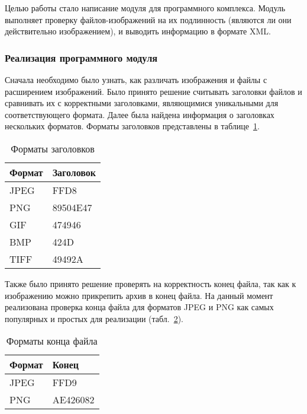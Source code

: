 Целью работы стало написание модуля для программного комплекса. Модуль выполняет проверку файлов-изображений на их подлинность (являются ли они действительно изображением), и выводить информацию в формате XML.

\subsubsection{Реализация программного модуля}
Сначала необходимо было узнать, как различать изображения и файлы с расширением изображений. Было принято решение считывать заголовки файлов и сравнивать их с корректными заголовками, являющимися уникальными для соответствующего формата. Далее была найдена информация о заголовках нескольких форматов. Форматы заголовков представлены в таблице~\ref{tab:formats}.

\begin{table}[ht]
\caption{Форматы заголовков}
\label{tab:formats}
\begin{center}
\begin{tabular}{|p{8cm}|p{9cm}|}
\hline
Формат & Заголовок \\
\hline
JPEG & FFD8 \\
\hline
PNG & 89504E47 \\
\hline
GIF & 474946 \\
\hline
BMP & 424D \\
\hline
TIFF & 49492A \\
\hline
\end{tabular}
\end{center}
\end{table}

Также было принято решение проверять на корректность конец файла, так как к изображению можно прикрепить архив в конец файла. На данный момент реализована проверка конца файла для форматов JPEG и PNG как самых популярных и простых для реализации (табл.~\ref{tab:ends}).

\begin{table}[ht]
\caption{Форматы конца файла}
\label{tab:ends}
\begin{center}
\begin{tabular}{|p{8cm}|p{9cm}|}
\hline
Формат & Конец \\
\hline
JPEG & FFD9 \\
\hline
PNG & AE426082 \\
\hline
\end{tabular}
\end{center}
\end{table}

